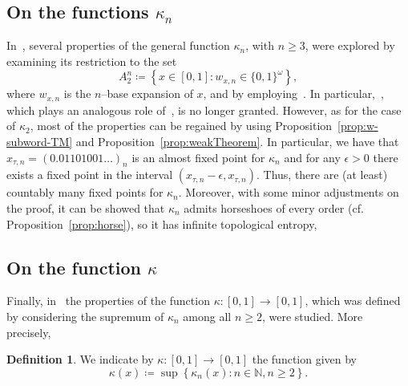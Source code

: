 \documentclass[12pt]{article}
\theoremstyle{plain}\newtheorem{teo}{Theorem}
\theoremstyle{plain}\newtheorem{proposition}[teo]{Proposition}
\theoremstyle{plain}\newtheorem{lemma}[teo]{Lemma}
\theoremstyle{plain}\newtheorem{corollary}[teo]{Corollary}
\theoremstyle{plain}\newtheorem{conjecture}[teo]{Conjecture}
\theoremstyle{definition}\newtheorem{definition}[teo]{Definition}
\theoremstyle{remark}\newtheorem{remark}[teo]{Remark}
\theoremstyle{definition}\newtheorem{example}[teo]{Example}
\numberwithin{teo}{section}
\numberwithin{equation}{section}
\begin{document}
\subsection{On the functions $\kappa_n$}

In~\cite{Critical},
several properties
of the general function $\kappa_n$,
with $n \ge 3$, were
explored by examining its restriction
to the set
\[
	A_2^n\coloneqq\left\{x \in [0,1]: w_{x,n} \in \{0,1\}^\omega\right\},
\]
where $w_{x,n}$ is the $n$--base expansion of $x$,
and by employing~\cite[Theorem 7]{Critical}.
In particular,~\cite[Corollary 42]{Critical},
which plays an analogous role of~\cite[Proposition 19]{Critical}, 
is no longer granted.
However, as for the case of $\kappa_2$,
most of the properties can be regained by 
using Proposition~\ref{prop:w-subword-TM}
and
Proposition~\ref{prop:weakTheorem}.
%
In particular, we have that 
$x_{\tau,n} = (0.01101001\dots)_n$
is an almost fixed point for $\kappa_n$
and for any $\epsilon > 0$
there exists a fixed point in the interval $(x_{\tau,n}- \epsilon,x_{\tau,n})$.
Thus, there are (at least) countably many
fixed points for $\kappa_n$.
Moreover, with some minor adjustments on the proof,
it can be showed that 
$\kappa_n$ admits horseshoes of every order
(cf. Proposition~\ref{prop:horse}),
so it has infinite topological entropy,

\subsection{On the function $\kappa$}
Finally, in~\cite{Critical} the properties of the function $\kappa\colon [0,1] \to [0,1]$, which was defined  by considering the supremum of $\kappa_n$
among all $n \ge 2$, were studied.  More precisely, 
\begin{definition}
We indicate by $\kappa\colon [0,1] \to [0,1]$ the function given by
\[
	\kappa(x)\coloneqq \sup\left\{\kappa_n(x): n \in \mathbb{N}, n \ge 2\right\}.
\]
\end{definition}
\end{document}
